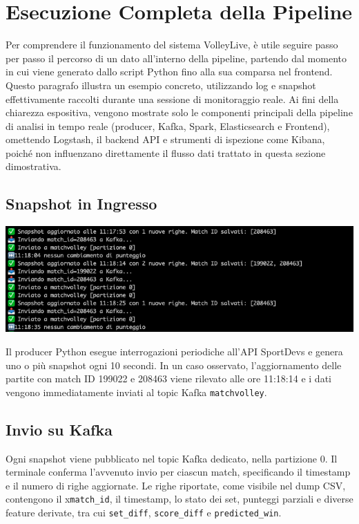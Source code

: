 \documentclass[a4paper,12pt]{report}
\begin{document}
\section{Esecuzione Completa della Pipeline}

Per comprendere il funzionamento del sistema VolleyLive, è utile seguire passo per passo il percorso di un dato all'interno della pipeline, partendo dal momento in cui viene generato dallo script Python fino alla sua comparsa nel frontend. Questo paragrafo illustra un esempio concreto, utilizzando log e snapshot effettivamente raccolti durante una sessione di monitoraggio reale.
Ai fini della chiarezza espositiva, vengono mostrate solo le componenti principali della pipeline di analisi in tempo reale (producer, Kafka, Spark, Elasticsearch e Frontend), omettendo Logstash, il backend API e strumenti di ispezione come Kibana, poiché non influenzano direttamente il flusso dati trattato in questa sezione dimostrativa.

\subsection*{Snapshot in Ingresso}

\noindent\begin{minipage}{\textwidth}
  \centering
    \includegraphics[width=\textwidth]{producer.png}
    \label{fig:producer.py}
\end{minipage}
Il producer Python esegue interrogazioni periodiche all’API SportDevs e genera uno o più snapshot ogni 10 secondi. In un caso osservato, l’aggiornamento delle partite con match ID 199022 e 208463 viene rilevato alle ore 11:18:14 e i dati vengono immediatamente inviati al topic Kafka \texttt{matchvolley}.


\subsection*{Invio su Kafka}
Ogni snapshot viene pubblicato nel topic Kafka dedicato, nella partizione 0. Il terminale conferma l’avvenuto invio per ciascun match, specificando il timestamp e il numero di righe aggiornate. Le righe riportate, come visibile nel dump CSV, contengono il x\texttt{match\_id}, il timestamp, lo stato dei set, punteggi parziali e diverse feature derivate, tra cui \texttt{set\_diff}, \texttt{score\_diff} e \texttt{predicted\_win}.
\end{document}
